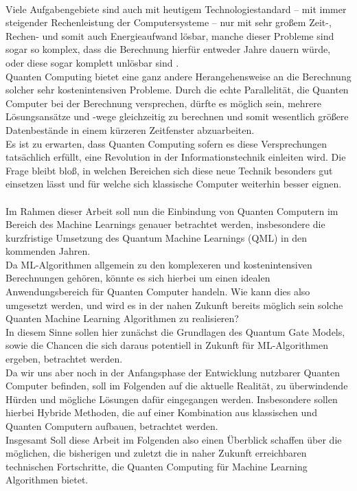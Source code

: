 \\
Viele Aufgabengebiete sind auch mit heutigem Technologiestandard – mit immer steigender Rechenleistung der Computersysteme – nur mit sehr großem Zeit-, Rechen- und somit auch Energieaufwand lösbar, manche dieser Probleme sind sogar so komplex, dass die Berechnung hierfür entweder Jahre dauern würde, oder diese sogar komplett unlösbar sind \cite{fraunhoferbigdata}.\\
Quanten Computing bietet eine ganz andere Herangehensweise an die Berechnung solcher sehr kostenintensiven Probleme. Durch die echte Parallelität, die Quanten Computer bei der Berechnung versprechen, dürfte es möglich sein, mehrere Lösungsansätze und -wege gleichzeitig zu berechnen und somit wesentlich größere Datenbestände in einem kürzeren Zeitfenster abzuarbeiten.\\
Es ist zu erwarten, dass Quanten Computing sofern es diese Versprechungen tatsächlich erfüllt, eine Revolution in der Informationstechnik einleiten wird. Die Frage bleibt bloß, in welchen Bereichen sich diese neue Technik besonders gut einsetzen lässt und für welche sich klassische Computer weiterhin besser eignen. \\
\\
Im Rahmen dieser Arbeit soll nun die  Einbindung von Quanten Computern im Bereich des Machine Learnings genauer betrachtet werden, insbesondere die kurzfristige Umsetzung des Quantum Machine Learnings (QML) in den kommenden Jahren.\\
Da ML-Algorithmen allgemein zu den komplexeren und kostenintensiven Berechnungen gehören, könnte es sich hierbei um einen idealen Anwendungsbereich für Quanten Computer handeln. Wie kann dies also umgesetzt werden, und wird es in der nahen Zukunft bereits möglich sein solche Quanten Machine Learning Algorithmen zu realisieren?\\
In diesem Sinne sollen hier zunächst die Grundlagen des Quantum Gate Models, sowie die Chancen die sich daraus potentiell in Zukunft für ML-Algorithmen ergeben, betrachtet werden. \\
Da wir uns aber noch in der Anfangsphase der Entwicklung nutzbarer Quanten Computer befinden, soll im Folgenden auf die aktuelle Realität, zu überwindende Hürden und mögliche Lösungen dafür eingegangen werden. Insbesondere sollen hierbei Hybride Methoden, die auf einer Kombination aus klassischen und Quanten Computern aufbauen, betrachtet werden.\\
Insgesamt Soll diese Arbeit im Folgenden also einen Überblick schaffen über die möglichen, die bisherigen und zuletzt die in naher Zukunft erreichbaren technischen Fortschritte, die Quanten Computing für Machine Learning Algorithmen bietet.

